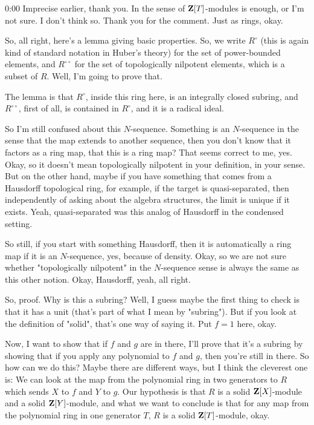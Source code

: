 \begin{unfinished}{0:00}
Imprecise earlier, thank you. In the sense of $\mathbf Z[T]$-modules is enough, or I'm not sure. I don't think so. Thank you for the comment. Just as rings, okay.

So, all right, here's a lemma giving basic properties. So, we write $R^{\circ}$ (this is again kind of standard notation in Huber's theory) for the set of power-bounded elements, and $R^{\circ \circ}$ for the set of topologically nilpotent elements, which is a subset of $R$. Well, I'm going to prove that.

The lemma is that $R^{\circ}$, inside this ring here, is an integrally closed subring, and $R^{\circ \circ}$, first of all, is contained in $R^{\circ}$, and it is a radical ideal.

So I'm still confused about this $N$-sequence. Something is an $N$-sequence in the sense that the map extends to another sequence, then you don't know that it factors as a ring map, that this is a ring map? That seems correct to me, yes. Okay, so it doesn't mean topologically nilpotent in your definition, in your sense. But on the other hand, maybe if you have something that comes from a Hausdorff topological ring, for example, if the target is quasi-separated, then independently of asking about the algebra structures, the limit is unique if it exists. Yeah, quasi-separated was this analog of Hausdorff in the condensed setting.

So still, if you start with something Hausdorff, then it is automatically a ring map if it is an $N$-sequence, yes, because of density. Okay, so we are not sure whether "topologically nilpotent" in the $N$-sequence sense is always the same as this other notion. Okay, Hausdorff, yeah, all right.

So, proof. Why is this a subring? Well, I guess maybe the first thing to check is that it has a unit (that's part of what I mean by "subring"). But if you look at the definition of "solid", that's one way of saying it. Put $f=1$ here, okay.

Now, I want to show that if $f$ and $g$ are in there, I'll prove that it's a subring by showing that if you apply any polynomial to $f$ and $g$, then you're still in there. So how can we do this? Maybe there are different ways, but I think the cleverest one is: We can look at the map from the polynomial ring in two generators to $R$ which sends $X$ to $f$ and $Y$ to $g$. Our hypothesis is that $R$ is a solid $\mathbf Z[X]$-module and a solid $\mathbf Z[Y]$-module, and what we want to conclude is that for any map from the polynomial ring in one generator $T$, $R$ is a solid $\mathbf Z[T]$-module, okay.


\end{unfinished}
